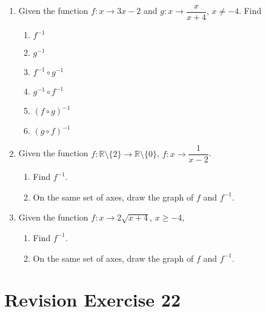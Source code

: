 \documentclass[12pt]{report}
\begin{document}
\begin{multicols}{2}
\begin{enumerate}
    \item Given the function $f:x \to 3x - 2$ and $g:x \to \dfrac{x}{x+4}$, $x \neq -4$.
          Find
          \begin{enumerate}
            \item $f^{-1}$
            \item $g^{-1}$
            \item $f^{-1} \circ g^{-1}$
            \item $g^{-1} \circ f^{-1}$
            \item $(f \circ g)^{-1}$
            \item $(g \circ f)^{-1}$
          \end{enumerate}

    \item Given the function $f: \mathbb{R} \setminus \{2\} \to \mathbb{R} \setminus
            \{0\}$, $f:x \to \dfrac{1}{x-2}$.
          \begin{enumerate}
            \item Find $f^{-1}$.
            \item On the same set of axes, draw the graph of $f$ and $f^{-1}$.
          \end{enumerate}

    \item Given the function $f:x \to 2\sqrt{x+4}$, $x \geq -4$,
          \begin{enumerate}
            \item Find $f^{-1}$.
            \item On the same set of axes, draw the graph of $f$ and $f^{-1}$.
          \end{enumerate}
  \end{enumerate}

\end{multicols}

\section*{Revision Exercise 22}

\setlength{\columnseprule}{1pt}
\setlength{\columnsep}{24pt}
\end{document}
